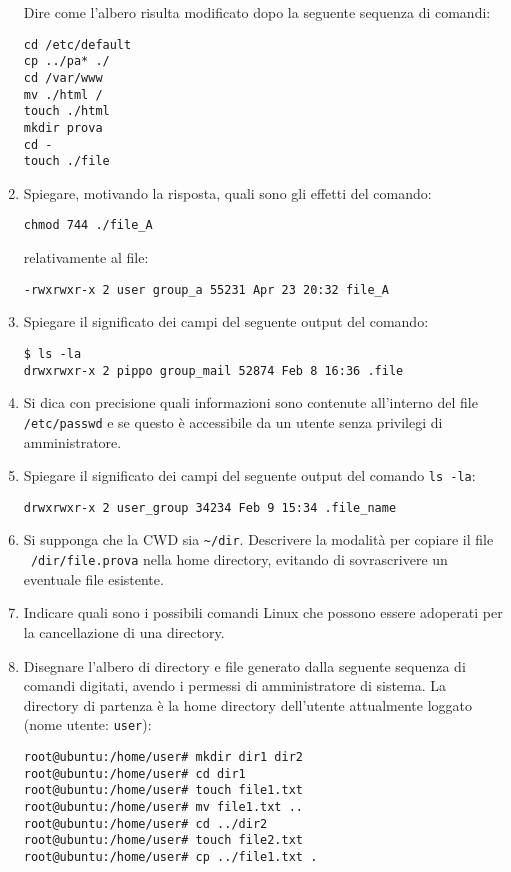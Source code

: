 \documentclass{report}
\begin{document}
\begin{enumerate}
Dire come l’albero risulta modificato dopo la seguente sequenza di comandi:
\begin{verbatim}
cd /etc/default
cp ../pa* ./
cd /var/www
mv ./html /
touch ./html
mkdir prova
cd -
touch ./file
\end{verbatim}

\item Spiegare, motivando la risposta, quali sono gli effetti del comando:
\begin{verbatim}
chmod 744 ./file_A
\end{verbatim}
relativamente al file:
\begin{verbatim}
-rwxrwxr-x 2 user group_a 55231 Apr 23 20:32 file_A
\end{verbatim}

\item Spiegare il significato dei campi del seguente output del comando:
\begin{verbatim}
$ ls -la
drwxrwxr-x 2 pippo group_mail 52874 Feb 8 16:36 .file
\end{verbatim}

\item Si dica con precisione quali informazioni sono contenute all’interno del file \texttt{/etc/passwd} e se questo è accessibile da un utente senza privilegi di amministratore.

\item Spiegare il significato dei campi del seguente output del comando \texttt{ls -la}:
\begin{verbatim}
drwxrwxr-x 2 user_group 34234 Feb 9 15:34 .file_name
\end{verbatim}

\item Si supponga che la CWD sia \texttt{\~{}/dir}. Descrivere la modalità per copiare il file \texttt{~/dir/file.prova} nella home directory, evitando di sovrascrivere un eventuale file esistente.

\item Indicare quali sono i possibili comandi Linux che possono essere adoperati per la cancellazione di una directory.

\item Disegnare l’albero di directory e file generato dalla seguente sequenza di comandi digitati, avendo i permessi di amministratore di sistema. La directory di partenza è la home directory dell’utente attualmente loggato (nome utente: \texttt{user}):
\begin{verbatim}
root@ubuntu:/home/user# mkdir dir1 dir2
root@ubuntu:/home/user# cd dir1
root@ubuntu:/home/user# touch file1.txt
root@ubuntu:/home/user# mv file1.txt ..
root@ubuntu:/home/user# cd ../dir2
root@ubuntu:/home/user# touch file2.txt
root@ubuntu:/home/user# cp ../file1.txt .
\end{verbatim}


\end{enumerate}
\end{document}
